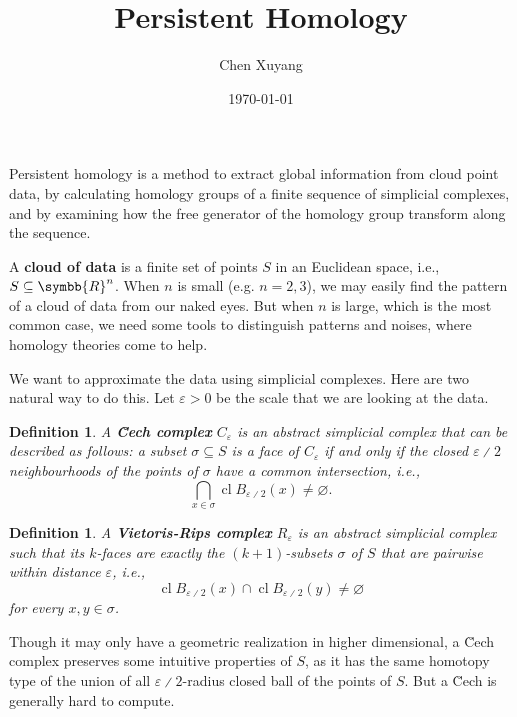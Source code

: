 \documentclass{assignment}[2019/10/15]
\title{Persistent Homology}
\author{Chen Xuyang}
\date{\today}
\institute{School of Mathematical Science}
\theoremstyle{plain}
\newtheorem{definition}[theorem]{Definition}
\newcommand{\RR}{\symbb{R}}
\renewcommand{\emph}[1]{\textbf{#1}}
\newcommand{\CECH}{\u{C}ech}
\newcommand{\DIV}{{\divslash}}
\DeclareMathOperator{\CL}{cl}
\begin{document}
  \maketitle

  Persistent homology is a method to extract global information from cloud point data, by calculating homology groups of a finite sequence of simplicial complexes, and by examining how the free generator of the homology group transform along the sequence.

  A \emph{cloud of data} is a finite set of points $S$ in an Euclidean space, i.e., $S\subseteq \RR^n$. When $n$ is small (e.g. $n=2, 3$), we may easily find the pattern of a cloud of data from our naked eyes. But when $n$ is large, which is the most common case, we need some tools to distinguish patterns and noises, where homology theories come to help.

  We want to approximate the data using simplicial complexes. Here are two natural way to do this. Let $\varepsilon>0$ be the scale that we are looking at the data.

  \begin{definition}
    A \emph{{\CECH} complex} $C_\varepsilon$ is an abstract simplicial complex that can be described as follows: a subset $\sigma\subseteq S$ is a face of $C_\varepsilon$ if and only if the closed $\varepsilon\DIV 2$ neighbourhoods of the points of $\sigma$ have a common intersection, i.e.,
    \begin{equation*}
      \bigcap_{x\in\sigma} \CL B_{\varepsilon\DIV 2}(x)\neq \varnothing.
    \end{equation*}
  \end{definition}

  \begin{definition}
    A \emph{Vietoris-Rips complex} $R_\varepsilon$ is an abstract simplicial complex such that its $k$-faces are exactly the $(k+1)$-subsets $\sigma$ of $S$ that are pairwise within distance $\varepsilon$, i.e.,
    \begin{equation*}
      \CL B_{\varepsilon\DIV 2}(x)\cap \CL B_{\varepsilon\DIV 2}(y)\neq \varnothing
    \end{equation*}
    for every $x, y\in\sigma$.
  \end{definition}

  Though it may only have a geometric realization in higher dimensional, a {\CECH} complex preserves some intuitive properties of $S$, as it has the same homotopy type of the union of all $\varepsilon\DIV 2$-radius closed ball of the points of $S$. But a {\CECH} is generally hard to compute.
\end{document}
